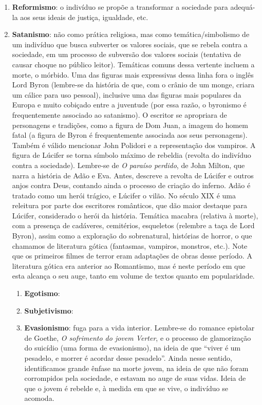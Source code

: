 \begin{enumerate}
\begin{enumerate}
\item \textbf{Reformismo}: o indivíduo se propõe a transformar a sociedade para adequá-la aos seus ideais de justiça, igualdade, etc.
\item \textbf{Satanismo}: não como prática religiosa, mas como temática/simbolismo de um indivíduo que busca subverter os valores sociais, que se rebela contra a sociedade, em um processo de subversão dos valores sociais (tentativa de causar choque no público leitor). Temáticas comuns dessa vertente incluem a morte, o mórbido. Uma das figuras mais expressivas dessa linha fora o inglês Lord Byron (lembre-se da história de que, com o crânio de um monge, criara um cálice para uso pessoal), inclusive uma das figuras mais populares da Europa e muito cobiçado entre a juventude (por essa razão, o byronismo é frequentemente associado ao satanismo). O escritor se apropriara de personagens e tradições, como a figura de Dom Juan, a imagem do homem fatal (a figura de Byron é frequentemente associada aos seus personagens). Também é válido mencionar John Polidori e a representação dos vampiros. A figura de Lúcifer se torna símbolo máximo de rebeldia (revolta do indivíduo contra a sociedade). Lembre-se de \textit{O paraíso perdido}, de John Milton, que narra a história de Adão e Eva. Antes, descreve a revolta de Lúcifer e outros anjos contra Deus, contando ainda o processo de criação do inferno. Adão é tratado como um herói trágico, e Lúcifer o vilão. No século XIX é uma releitura por parte dos escritores românticos, que dão maior destaque para Lúcifer, considerado o herói da história. Temática macabra (relativa à morte), com a presença de cadáveres, cemitérios, esqueletos (relembre a taça de Lord Byron), assim como a exploração do sobrenatural, histórias de horror, o que chamamos de literatura gótica (fantasmas, vampiros, monstros, etc.). Note que os primeiros filmes de terror eram adaptações de obras desse período. A literatura gótica era anterior ao Romantismo, mas é neste período em que esta alcança o seu auge, tanto em volume de textos quanto em popularidade.
\begin{enumerate}
\item \textbf{Egotismo}:
\item \textbf{Subjetivismo}:
\item \textbf{Evasionismo}: fuga para a vida interior. Lembre-se do romance epistolar de Goethe, \textit{O sofrimento do jovem Verter}, e o processo de glamorização do suicídio (uma forma de evasionismo), na ideia de que ``viver é um pesadelo, e morrer é acordar desse pesadelo''. Ainda nesse sentido, identificamos grande ênfase na morte jovem, na ideia de que não foram corrompidos pela sociedade, e estavam no auge de suas vidas. Ideia de que o jovem é rebelde e, à medida em que se vive, o indivíduo se acomoda.

\end{enumerate}
\end{enumerate}
\end{enumerate}

